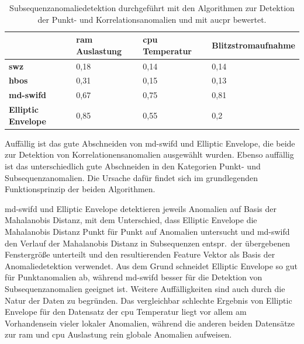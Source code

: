 \begin{table}[ht]
    \centering
    \renewcommand{\arraystretch}{1.5} %
    \begin{tabular}{l|lll}
                                & \textbf{\ac{ram} Auslastung}  & \textbf{\ac{cpu} Temperatur}  & \textbf{Blitzstromaufnahme} \\
    \hline
    \textbf{\ac{swz}}           & \cellcolor{red!17}0,18        & \cellcolor{red!20}0,14        & \cellcolor{red!20}0,14 \\
    \textbf{\ac{hbos}}          & \cellcolor{red!2}0,31         & \cellcolor{red!20}0,15        & \cellcolor{red!20}0,13 \\
    \textbf{\ac{md-swifd}}      & \cellcolor{green!15}0,67      & \cellcolor{green!25}0,75      & \cellcolor{green!30}0,81 \\
    \textbf{Elliptic Envelope}  & \cellcolor{green!30}0,85      & \cellcolor{green!10}0,55      & \cellcolor{red!12}0,2 
    \end{tabular}
    \caption{\centering Subsequenzanomaliedetektion durchgeführt mit den Algorithmen zur Detektion der Punkt- und Korrelationsanomalien und mit \acs*{aucpr} bewertet.}
    \label{tab:subsequenzanomaliedetektion_kreuzweise}
\end{table}

Auffällig ist das gute Abschneiden von \ac{md-swifd} und Elliptic Envelope, die beide zur Detektion von Korrelationensanomalien ausgewählt wurden. Ebenso auffällig
ist das unterschiedlich gute Abschneiden in den Kategorien Punkt- und Subsequenzanomalien. Die Ursache dafür findet sich im grundlegenden Funktionsprinzip der
beiden Algorithmen.

\ac{md-swifd} und Elliptic Envelope detektieren jeweils Anomalien auf Basis der Mahalanobis Distanz, mit dem Unterschied, dass Elliptic Envelope die Mahalanobis Distanz
Punkt für Punkt auf Anomalien untersucht und \ac{md-swifd} den Verlauf der Mahalanobis Distanz in Subsequenzen entspr.~der übergebenen Fenstergröße unterteilt und den
resultierenden Feature Vektor als Basis der Anomaliedetektion verwendet. Aus dem Grund schneidet Elliptic Envelope so gut für Punktanomalien ab, während \ac{md-swifd}
besser für die Detektion von Subsequenzanomalien geeignet ist. Weitere Auffälligkeiten sind auch durch die Natur der Daten zu begründen. Das vergleichbar schlechte
Ergebnis von Elliptic Envelope für den Datensatz der \ac{cpu} Temperatur liegt vor allem am Vorhandensein vieler lokaler Anomalien, während die anderen beiden
Datensätze zur \ac{ram} und \ac{cpu} Auslastung rein globale Anomalien aufweisen.

